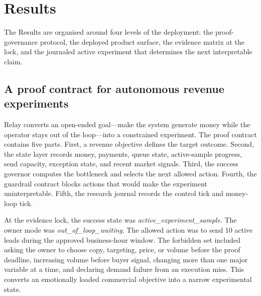 \documentclass[12pt,letterpaper]{article}
\begin{document}
\section{Results}

The Results are organised around four levels of the deployment: the proof-governance protocol, the deployed product surface, the evidence matrix at the lock, and the journaled active experiment that determines the next interpretable claim.

\subsection{A proof contract for autonomous revenue experiments}

Relay converts an open-ended goal---make the system generate money while the operator stays out of the loop---into a constrained experiment. The proof contract contains five parts. First, a revenue objective defines the target outcome. Second, the state layer records money, payments, queue state, active-sample progress, send capacity, exception state, and recent market signals. Third, the success governor computes the bottleneck and selects the next allowed action. Fourth, the guardrail contract blocks actions that would make the experiment uninterpretable. Fifth, the research journal records the control tick and money-loop tick.

At the evidence lock, the success state was \emph{active\_experiment\_sample}. The owner mode was \emph{out\_of\_loop\_waiting}. The allowed action was to send 10 active leads during the approved business-hour window. The forbidden set included asking the owner to choose copy, targeting, price, or volume before the proof deadline, increasing volume before buyer signal, changing more than one major variable at a time, and declaring demand failure from an execution miss. This converts an emotionally loaded commercial objective into a narrow experimental state.
\end{document}

